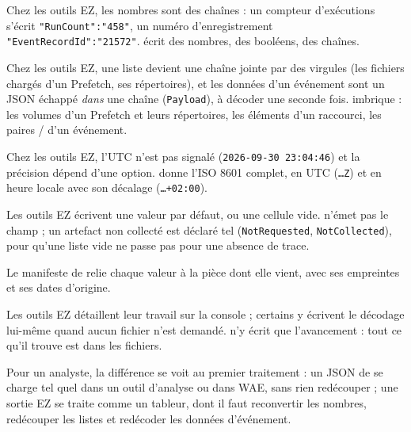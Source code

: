 \documentclass[11pt,a4paper,oneside]{report}
\begin{document}
\begin{description}[style=nextline,leftmargin=1em]
  \item[Types] Chez les outils EZ, les nombres sont des chaînes : un compteur
        d'exécutions s'écrit \texttt{"RunCount":"458"}, un numéro
        d'enregistrement \texttt{"EventRecordId":"21572"}. \wac{} écrit des
        nombres, des booléens, des chaînes.
  \item[Structures] Chez les outils EZ, une liste devient une chaîne jointe par
        des virgules (les fichiers chargés d'un Prefetch, ses répertoires), et les
        données d'un événement sont un JSON échappé \emph{dans} une chaîne
        (\texttt{Payload}), à décoder une seconde fois. \wac{} imbrique : les
        volumes d'un Prefetch et leurs répertoires, les éléments d'un raccourci,
        les paires / d'un événement.
  \item[Dates] Chez les outils EZ, l'UTC n'est pas signalé
        (\texttt{2026-09-30 23:04:46}) et la précision dépend d'une option. \wac{}
        donne l'ISO 8601 complet, en UTC (\texttt{…Z}) et en heure locale avec son
        décalage (\texttt{…+02:00}).
  \item[Absence de valeur] Les outils EZ écrivent une valeur par défaut, ou une
        cellule vide. \wac{} n'émet pas le champ ; un artefact non collecté est
        déclaré tel (\texttt{NotRequested}, \texttt{NotCollected}), pour qu'une
        liste vide ne passe pas pour une absence de trace.
  \item[Provenance] Le manifeste de \wac{} relie chaque valeur à la pièce dont
        elle vient, avec ses empreintes et ses dates d'origine.
  \item[Console] Les outils EZ détaillent leur travail sur la console ; certains
        y écrivent le décodage lui-même quand aucun fichier n'est demandé. \wac{}
        n'y écrit que l'avancement : tout ce qu'il trouve est dans les fichiers.
\end{description}

\begin{note}
Pour un analyste, la différence se voit au premier traitement : un JSON de
\wac{} se charge tel quel dans un outil d'analyse ou dans WAE, sans rien
redécouper ; une sortie EZ se traite comme un tableur, dont il faut reconvertir
les nombres, redécouper les listes et redécoder les données d'événement.
\end{note}

\end{document}
